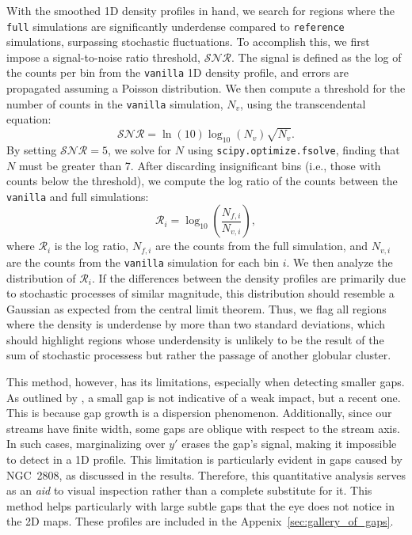 \documentclass{aa}
\begin{document}
\begin{appendix}
    With the smoothed 1D density profiles in hand, we search for regions where the \texttt{full} simulations are significantly underdense compared to \texttt{reference} simulations, surpassing stochastic fluctuations. To accomplish this, we first impose a signal-to-noise ratio threshold, $\mathcal{SNR}$. The signal is defined as the log of the counts per bin from the \texttt{vanilla} 1D density profile, and errors are propagated assuming a Poisson distribution. We then compute a threshold for the number of counts in the \texttt{vanilla} simulation, $N_v$, using the transcendental equation:
    \begin{equation}
        \mathcal{SNR} = \ln(10) \log_{10}\left(N_v\right) \sqrt{N_v}.
      \end{equation} \label{eq:density_threshold}
    By setting $\mathcal{SNR} = 5$, we solve for $N$ using \texttt{scipy.optimize.fsolve}, finding that $N$ must be greater than 7. After discarding insignificant bins (i.e., those with counts below the threshold), we compute the log ratio of the counts between the \texttt{vanilla} and full simulations:
    \begin{equation}
        \mathcal{R}_i = \log_{10}\left(\frac{N_{f,i}}{N_{v,i}}\right),
      \end{equation}
    where $\mathcal{R}_i$ is the log ratio, $N_{f,i}$ are the counts from the full simulation, and $N_{v,i}$ are the counts from the \texttt{vanilla} simulation for each bin $i$. We then analyze the distribution of $\mathcal{R}_i$. If the differences between the density profiles are primarily due to stochastic processes of similar magnitude, this distribution should resemble a Gaussian as expected from the central limit theorem. Thus, we flag all regions where the density is underdense by more than two standard deviations, which should highlight regions whose underdensity is unlikely to be the result of the sum of stochastic processess but rather the passage of another globular cluster. 

    This method, however, has its limitations, especially when detecting smaller gaps. As outlined by \citet{2015MNRAS.450.1136E}, a small gap is not indicative of a weak impact, but a recent one. This is because gap growth is a dispersion phenomenon. Additionally, since our streams have finite width, some gaps are oblique with respect to the stream axis. In such cases, marginalizing over $y'$ erases the gap's signal, making it impossible to detect in a 1D profile. This limitation is particularly evident in gaps caused by NGC~2808, as discussed in the results. Therefore, this quantitative analysis serves as an \textit{aid} to visual inspection rather than a complete substitute for it. This method helps particularly with large subtle gaps that the eye does not notice in the 2D maps. These profiles are included in the Appenix~\ref{sec:gallery_of_gaps}.



\end{appendix}
\end{document}
